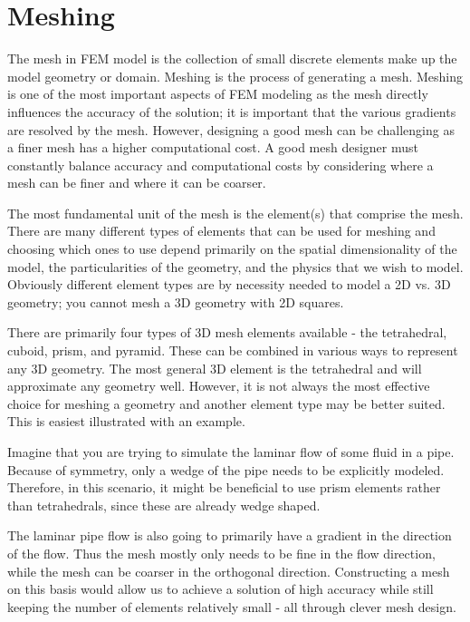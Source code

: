 \section{Meshing}\label{sec:meshing}

The mesh in FEM model is the collection of small discrete elements make up the model geometry or domain.
Meshing is the process of generating a mesh.
Meshing is one of the most important aspects of FEM modeling as the mesh directly influences the accuracy of the solution; it is important that the various gradients are resolved by the mesh.
However, designing a good mesh can be challenging as a finer mesh has a higher computational cost.
A good mesh designer must constantly balance accuracy and computational costs by considering where a mesh can be finer and where it can be coarser.\par

The most fundamental unit of the mesh is the element(s) that comprise the mesh.
There are many different types of elements that can be used for meshing and choosing which ones to use depend primarily on the spatial dimensionality of the model, the particularities of the geometry, and the physics that we wish to model.
Obviously different element types are by necessity needed to model a 2D vs. 3D geometry; you cannot mesh a 3D geometry with 2D squares.\par

There are primarily four types of 3D mesh elements available - the tetrahedral, cuboid, prism, and pyramid.
These can be combined in various ways to represent any 3D geometry.
The most general 3D element is the tetrahedral and will approximate any geometry well.
However, it is not always the most effective choice for meshing a geometry and another element type may be better suited.
This is easiest illustrated with an example.\par

Imagine that you are trying to simulate the laminar flow of some fluid in a pipe.
Because of symmetry, only a wedge of the pipe needs to be explicitly modeled.
Therefore, in this scenario, it might be beneficial to use prism elements rather than tetrahedrals, since these are already wedge shaped.

The laminar pipe flow is also going to primarily have a gradient in the direction of the flow.
Thus the mesh mostly only needs to be fine in the flow direction, while the mesh can be coarser in the orthogonal direction.
Constructing a mesh on this basis would allow us to achieve a solution of high accuracy while still keeping the number of elements relatively small - all through clever mesh design.\par

